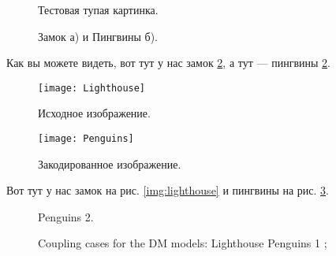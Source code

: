 \documentclass[a4paper,12pt]{report} %
\begin{document}
  \tableofcontents %
  \begin{figure}[h]
    \caption{Тестовая тупая картинка.}
    \label{img:image}
  \end{figure}
  \begin{figure}[h]
    \begin{minipage}[h]{0.49\linewidth}
    \end{minipage}
    \hfill
    \begin{minipage}[h]{0.49\linewidth}
    \end{minipage}
    \caption{Замок а) и Пингвины б).}
    \label{img:castle_penguins}
  \end{figure}
  Как вы можете видеть, вот тут у нас замок \ref{img:castle_penguins}, а тут — пингвины \ref{img:castle_penguins}.
  \begin{figure}[h]
    \begin{center}
      \begin{minipage}[h]{0.4\linewidth}
        \texttt{[image: Lighthouse]}
        \caption{Исходное изображение.} %
        \label{img:lighthouse} %
      \end{minipage}
      \hfill 
      \begin{minipage}[h]{0.4\linewidth}
        \texttt{[image: Penguins]}
        \caption{Закодированное изображение.}
        \label{img:penguins}
      \end{minipage}
    \end{center}
  \end{figure}
  Вот тут у нас замок на рис. \ref{img:lighthouse} и пингвины на рис. \ref{img:penguins}.
  \begin{figure}[ht!]
    \vspace{-4ex}
    \centering
    \hspace{4ex}
    \hspace{4ex}
    \caption{Coupling cases for the DM models: 
     Lighthouse
     Penguins 1 ; 
    } Penguins 2.
    \label{fig:threeDMcases}
  \end{figure}
\end{document}
